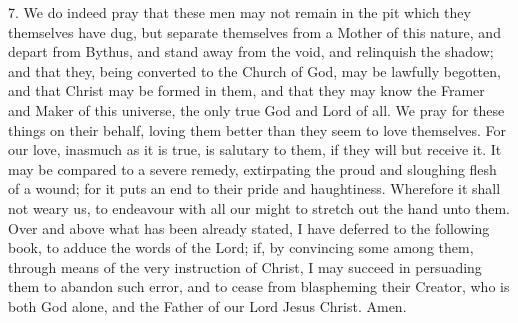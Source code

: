 7. We do indeed pray that these men may not remain in the pit which they themselves have dug, but separate themselves from a Mother of this nature, and depart from Bythus, and stand away from the void, and relinquish the shadow; and that they, being converted to the Church of God, may be lawfully begotten, and that Christ may be formed in them, and that they may know the Framer and Maker of this universe, the only true God and Lord of all. We pray for these things on their behalf, loving them better than they seem to love themselves. For our love, inasmuch as it is true, is salutary to them, if they will but receive it. It may be compared to a severe remedy, extirpating the proud and sloughing flesh of a wound; for it puts an end to their pride and haughtiness. Wherefore it shall not weary us, to endeavour with all our might to stretch out the hand unto them. Over and above what has been already stated, I have deferred to the following book, to adduce the words of the Lord; if, by convincing some among them, through means of the very instruction of Christ, I may succeed in persuading them to abandon such error, and to cease from blaspheming their Creator, who is both God alone, and the Father of our Lord Jesus Christ. Amen.
